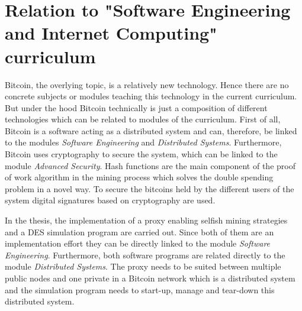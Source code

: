 \documentclass{scrartcl}
\begin{document}
\section{Relation to "Software Engineering and Internet Computing" curriculum}
Bitcoin, the overlying topic, is a relatively new technology. Hence there are no concrete subjects or modules teaching this technology in the current curriculum. But under the hood Bitcoin technically is just a composition of different technologies which can be related to modules of the curriculum. First of all, Bitcoin is a software acting as a distributed system and can, therefore, be linked to the modules \textit{Software Engineering} and \textit{Distributed Systems}. Furthermore, Bitcoin uses cryptography to secure the system, which can be linked to the module \textit{Advanced Security}. Hash functions are the main component of the proof of work algorithm in the mining process which solves the double spending problem in a novel way. To secure the bitcoins held by the different users of the system digital signatures based on cryptography are used.

In the thesis, the implementation of a proxy enabling selfish mining strategies and a DES simulation program are carried out. Since both of them are an implementation effort they can be directly linked to the module \textit{Software Engineering}. Furthermore, both software programs are related directly to the module \textit{Distributed Systems}. The proxy needs to be suited between multiple public nodes and one private in a Bitcoin network which is a distributed system and the simulation program needs to start-up, manage and tear-down this distributed system.


\end{document}
